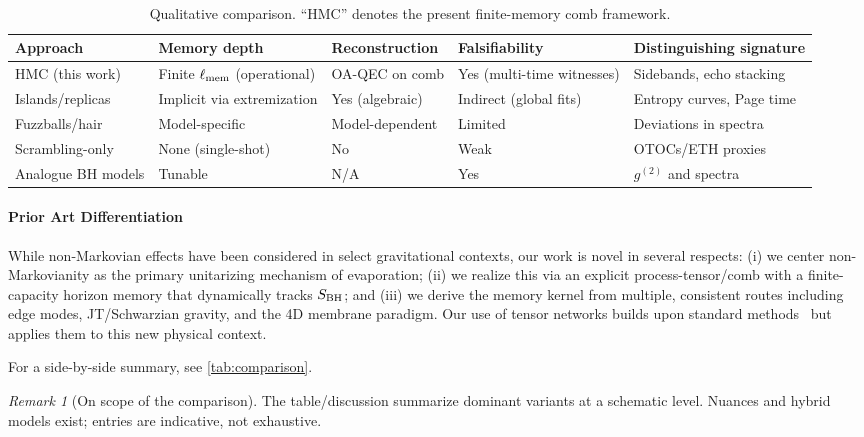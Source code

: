 \documentclass[a4paper,11pt]{article}
\newcommand{\HMC}{\textsc{HMC}\xspace}
\theoremstyle{plain}
\theoremstyle{definition}
\theoremstyle{remark}
\newtheorem{remark}{Remark}
\begin{document}
\paragraph{~}
\begin{table}[t]
\centering
\caption{Qualitative comparison. ``\HMC{}'' denotes the present finite-memory comb framework.}
\label{tab:rw-comparison}
\begin{tabular}{@{}lllll@{}}
\toprule
Approach & Memory depth & Reconstruction & Falsifiability & Distinguishing signature \\
\midrule
\HMC{} (this work) & Finite $\ell_{\rm mem}$ (operational) & OA-QEC on comb & Yes (multi-time witnesses) & Sidebands, echo stacking \\
Islands/replicas & Implicit via extremization & Yes (algebraic) & Indirect (global fits) & Entropy curves, Page time \\
Fuzzballs/hair & Model-specific & Model-dependent & Limited & Deviations in spectra \\
Scrambling-only & None (single-shot) & No & Weak & OTOCs/ETH proxies \\
Analogue BH models & Tunable & N/A & Yes & $g^{(2)}$ and spectra \\
\bottomrule
\end{tabular}
\end{table}

\paragraph{Prior Art Differentiation} While non-Markovian effects have been considered in select gravitational contexts, our work is novel in several respects: (i) we center non-Markovianity as the primary unitarizing mechanism of evaporation; (ii) we realize this via an explicit process-tensor/comb with a finite-capacity horizon memory that dynamically tracks $S_{\rm BH}$; and (iii) we derive the memory kernel from multiple, consistent routes including edge modes, JT/Schwarzian gravity, and the 4D membrane paradigm. Our use of tensor networks builds upon standard methods~\cite{Schollwock:2011, Orus:2014} but applies them to this new physical context.

For a side-by-side summary, see \cref{tab:comparison}.

\begin{remark}[On scope of the comparison]
The table/discussion summarize dominant variants at a schematic level. Nuances and hybrid models exist; entries are indicative, not exhaustive.
\end{remark}
\end{document}
